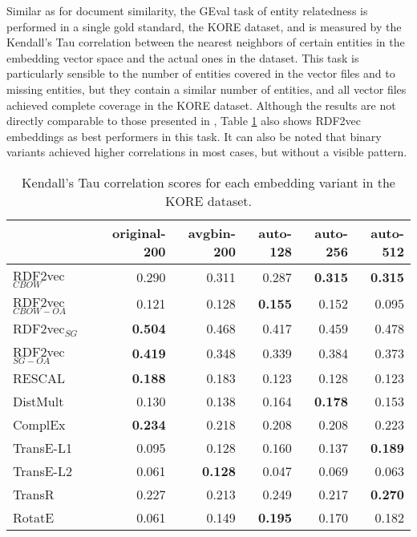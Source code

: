 \documentclass[11pt,titlepage,oneside,openany]{book}
\begin{document}
Similar as for document similarity, the GEval task of entity relatedness is performed in a single gold standard, the KORE dataset, and is measured by the Kendall's Tau correlation between the nearest neighbors of certain entities in the embedding vector space and the actual ones in the dataset. This task is particularly sensible to the number of entities covered in the vector files and to missing entities, but they contain a similar number of entities, and all vector files achieved complete coverage in the KORE dataset. Although the results are not directly comparable to those presented in \cite{portisch_rdf2vec_2023}, Table \ref{tab:geval-entrel-tau-kore} also shows RDF2vec embeddings as best performers in this task. It can also be noted that binary variants achieved higher correlations in most cases, but without a visible pattern.\\
\begin{table}[h!]
\centering
\begin{tabular}{lrrrrr}
\toprule
{} &  original-200 &  avgbin-200 &  auto-128 &  auto-256 &  auto-512 \\
\midrule
RDF2vec$_{CBOW}$     &         0.290  &       0.311  &     0.287  &	\textbf{0.315} &	\textbf{0.315} \\
RDF2vec$_{CBOW-OA}$  &         0.121  &       0.128  &	\textbf{0.155} &     0.152  &     0.095  \\
RDF2vec$_{SG}$       &	\textbf{0.504} &       0.468  &     0.417  &     0.459  &     0.478  \\
RDF2vec$_{SG-OA}$    &	\textbf{0.419} &       0.348  &     0.339  &     0.384  &     0.373  \\
RESCAL               &	\textbf{0.188} &       0.183  &     0.123  &     0.128  &     0.123  \\
DistMult             &         0.130  &       0.138  &     0.164  &	\textbf{0.178} &     0.153  \\
ComplEx              &	\textbf{0.234} &       0.218  &     0.208  &     0.208  &     0.223  \\
TransE-L1            &         0.095  &       0.128  &     0.160  &     0.137  &	\textbf{0.189} \\
TransE-L2            &         0.061  &	\textbf{0.128} &     0.047  &     0.069  &     0.063  \\
TransR               &         0.227  &       0.213  &     0.249  &     0.217  &	\textbf{0.270} \\
RotatE               &         0.061  &       0.149  &	\textbf{0.195} &     0.170  &     0.182  \\
\bottomrule
\end{tabular}
\caption{Kendall's Tau correlation scores for each embedding variant in the KORE dataset.}
\label{tab:geval-entrel-tau-kore}
\end{table}
\end{document}

